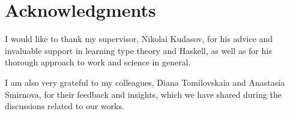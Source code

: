 \clearpage
\thispagestyle{empty}
\section*{Acknowledgments}

I would like to thank my supervisor, Nikolai Kudasov, for his advice and invaluable support in learning type theory and Haskell, as well as for his thorough approach to work and science in general.

I am also very grateful to my colleagues, Diana Tomilovskaia and Anastasia Smirnova, for their feedback and insights, which we have shared during the discussions related to our works.
